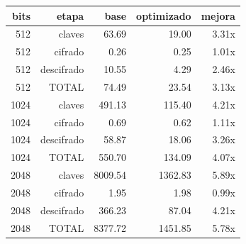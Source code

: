 \begin{tabular}{rrrrr}
\toprule
bits & etapa & base & optimizado & mejora \\
\midrule
512 & claves & 63.69 & 19.00 & 3.31x \\
512 & cifrado & 0.26 & 0.25 & 1.01x \\
512 & descifrado & 10.55 & 4.29 & 2.46x \\
512 & TOTAL & 74.49 & 23.54 & 3.13x \\
1024 & claves & 491.13 & 115.40 & 4.21x \\
1024 & cifrado & 0.69 & 0.62 & 1.11x \\
1024 & descifrado & 58.87 & 18.06 & 3.26x \\
1024 & TOTAL & 550.70 & 134.09 & 4.07x \\
2048 & claves & 8009.54 & 1362.83 & 5.89x \\
2048 & cifrado & 1.95 & 1.98 & 0.99x \\
2048 & descifrado & 366.23 & 87.04 & 4.21x \\
2048 & TOTAL & 8377.72 & 1451.85 & 5.78x \\
\bottomrule
\end{tabular}
